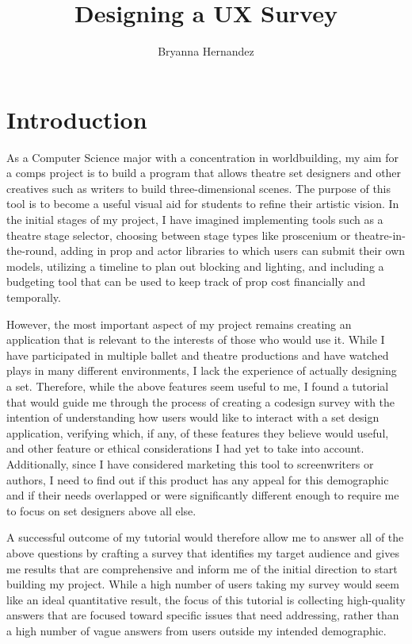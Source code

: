 \documentclass[10pt,twocolumn]{article}
\title{Designing a UX Survey}
\author{Bryanna Hernandez}
\affiliation{Occidental College}
\begin{document}
\maketitle

\section{Introduction}
As a Computer Science major with a concentration in worldbuilding, my aim for a comps project is to build a program that allows theatre set designers and other creatives such as writers to build three-dimensional scenes. The purpose of this tool is to become a useful visual aid for students to refine their artistic vision. In the initial stages of my project, I have imagined implementing tools such as a theatre stage selector, choosing between stage types like proscenium or theatre-in-the-round, adding in prop and actor libraries to which users can submit their own models, utilizing a timeline to plan out blocking and lighting, and including a budgeting tool that can be used to keep track of prop cost financially and temporally.

However, the most important aspect of my project remains creating an application that is relevant to the interests of those who would use it. While I have participated in multiple ballet and theatre productions and have watched plays in many different environments, I lack the experience of actually designing a set. Therefore, while the above features seem useful to me, I found a tutorial that would guide me through the process of creating a codesign survey with the intention of understanding how users would like to interact with a set design application, verifying which, if any, of these features they believe would useful, and other feature or ethical considerations I had yet to take into account. Additionally, since I have considered marketing this tool to screenwriters or authors, I need to find out if this product has any appeal for this demographic and if their needs overlapped or were significantly different enough to require me to focus on set designers above all else. 

A successful outcome of my tutorial would therefore allow me to answer all of the above questions by crafting a survey that identifies my target audience and gives me results that are comprehensive and inform me of the initial direction to start building my project. While a high number of users taking my survey would seem like an ideal quantitative result, the focus of this tutorial is collecting high-quality answers that are focused toward specific issues that need addressing, rather than a high number of vague answers from users outside my intended demographic. 
\end{document}

